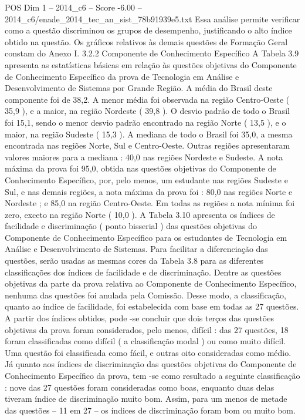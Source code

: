 \begin{textsample}{POS Dim 1 – 2014\_c6 – Score -6.00 – 2014\_c6/enade\_2014\_tec\_an\_sist\_78b91939e5.txt}
Essa análise permite verificar como a questão discriminou os grupos de desempenho, justificando o alto índice obtido na questão.
Os gráficos relativos às demais questões de Formação Geral constam do Anexo I. 3.2.2 Componente de Conhecimento Específico A Tabela 3.9 apresenta as estatísticas básicas em relação às questões objetivas do Componente de Conhecimento Específico da prova de Tecnologia em Análise e Desenvolvimento de Sistemas por Grande Região.
A média do Brasil deste componente foi de 38,2.
A menor média foi observada na região Centro-Oeste ( 35,9 ), e a maior, na região Nordeste ( 39,8 ).
O desvio padrão de todo o Brasil foi 15,1, sendo o menor desvio padrão encontrado na região Norte ( 13,5 ), e o maior, na região Sudeste ( 15,3 ).
A mediana de todo o Brasil foi 35,0, a mesma encontrada nas regiões Norte, Sul e Centro-Oeste.
Outras regiões apresentaram valores maiores para a mediana : 40,0 nas regiões Nordeste e Sudeste.
A nota máxima da prova foi 95,0, obtida nas questões objetivas do Componente de Conhecimento Específico, por, pelo menos, um estudante nas regiões Sudeste e Sul, e nas demais regiões, a nota máxima da prova foi : 80,0 nas regiões Norte e Nordeste ; e 85,0 na região Centro-Oeste.
Em todas as regiões a nota mínima foi zero, exceto na região Norte ( 10,0 ).
A Tabela 3.10 apresenta os índices de facilidade e discriminação ( ponto bisserial ) das questões objetivas do Componente de Conhecimento Específico para os estudantes de Tecnologia em Análise e Desenvolvimento de Sistemas.
Para facilitar a diferenciação das questões, serão usadas as mesmas cores da Tabela 3.8 para as diferentes classificações dos índices de facilidade e de discriminação.
Dentre as questões objetivas da parte da prova relativa ao Componente de Conhecimento Específico, nenhuma das questões foi anulada pela Comissão.
Desse modo, a classificação, quanto ao índice de facilidade, foi estabelecida com base em todas as 27 questões.
A partir dos índices obtidos, pode -se concluir que dois terços das questões objetivas da prova foram considerados, pelo menos, difícil : das 27 questões, 18 foram classificadas como difícil ( a classificação modal ) ou como muito difícil.
Uma questão foi classificada como fácil, e outras oito consideradas como médio.
Já quanto aos índices de discriminação das questões objetivas do Componente de Conhecimento Específico da prova, tem -se como resultado a seguinte classificação : nove das 27 questões foram consideradas como boas, enquanto duas delas tiveram índice de discriminação muito bom.
Assim, para um menos de metade das questões – 11 em 27 – os índices de discriminação foram bom ou muito bom.

\end{textsample}
